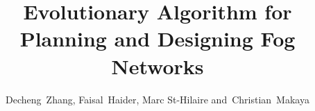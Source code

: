 \documentclass[10pt,journal,compsoc]{IEEEtran}
\begin{document}
%
\title{Evolutionary Algorithm for Planning and Designing Fog Networks}
%
%
%
%

\author{Decheng~Zhang, %
        Faisal~Haider, %
        Marc St-Hilaire %
        and~Christian~Makaya%

}

% 
%
\end{document}
